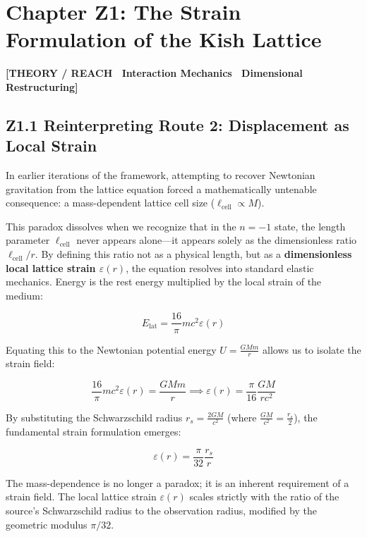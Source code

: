 \documentclass[11pt, letterpaper, openany]{book}
\begin{document}
\section*{Chapter Z1: The Strain Formulation of the Kish Lattice}

\begin{center}
{\color{theorytag}\textbf{[THEORY / REACH \textbullet\ Interaction Mechanics \textbullet\ Dimensional Restructuring]}}
\end{center}

\subsection*{Z1.1 Reinterpreting Route 2: Displacement as Local Strain}

In earlier iterations of the framework, attempting to recover Newtonian gravitation from the lattice equation forced a mathematically untenable consequence: a mass-dependent lattice cell size ($\ell_{\text{cell}} \propto M$). 

This paradox dissolves when we recognize that in the $n=-1$ state, the length parameter $\ell_{\text{cell}}$ never appears alone—it appears solely as the dimensionless ratio $\ell_{\text{cell}}/r$. By defining this ratio not as a physical length, but as a \textbf{dimensionless local lattice strain $\varepsilon(r)$}, the equation resolves into standard elastic mechanics. Energy is the rest energy multiplied by the local strain of the medium:

\[
E_{\text{lat}} = \frac{16}{\pi} m c^2 \varepsilon(r)
\]

Equating this to the Newtonian potential energy $U = \frac{GMm}{r}$ allows us to isolate the strain field:

\[
\frac{16}{\pi} m c^2 \varepsilon(r) = \frac{GMm}{r} \implies \varepsilon(r) = \frac{\pi}{16} \frac{GM}{r c^2}
\]

By substituting the Schwarzschild radius $r_s = \frac{2GM}{c^2}$ (where $\frac{GM}{c^2} = \frac{r_s}{2}$), the fundamental strain formulation emerges:

\[
\varepsilon(r) = \frac{\pi}{32} \frac{r_s}{r}
\]

The mass-dependence is no longer a paradox; it is an inherent requirement of a strain field. The local lattice strain $\varepsilon(r)$ scales strictly with the ratio of the source's Schwarzschild radius to the observation radius, modified by the geometric modulus $\pi/32$.
\end{document}
